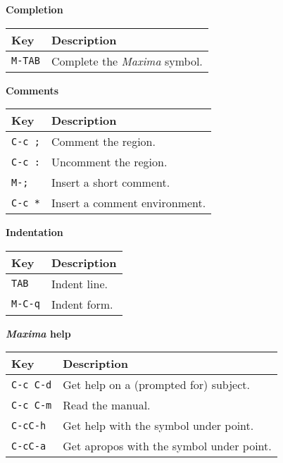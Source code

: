 \documentclass{article}
\newcommand{\mx}{\textsl{\sffamily Maxima}}
\begin{document}
\smallskip

\noindent
\textbf{Completion}

\smallskip

\noindent
\begin{tabular}{p{\firstcol}p{\secondcol}}
\hline
\textbf{Key} & \textbf{Description}\\
\hline
\texttt{M-TAB} & Complete the \mx{} symbol.\\
\end{tabular}

\smallskip

\noindent
\textbf{Comments}

\smallskip

\noindent
\begin{tabular}{p{\firstcol}p{\secondcol}}
\hline
\textbf{Key} & \textbf{Description}\\
\hline
\texttt{C-c ;} & Comment the region.\\
\texttt{C-c :} & Uncomment the region.\\
\texttt{M-;} & Insert a short comment.\\
\texttt{C-c *} & Insert a comment environment.
\end{tabular}


\smallskip

\noindent
\textbf{Indentation}

\smallskip

\noindent
\begin{tabular}{p{\firstcol}p{\secondcol}}
\hline
\textbf{Key} & \textbf{Description}\\
\hline
\texttt{TAB} & Indent line.\\
\texttt{M-C-q} & Indent form.
\end{tabular}


\smallskip

\noindent
\textbf{\mx{} help}

\smallskip

\noindent
\begin{tabular}{p{\firstcol}p{\secondcol}}
\hline
\textbf{Key} & \textbf{Description}\\
\hline
\texttt{C-c C-d}
& Get help on a (prompted for) subject.\\
\texttt{C-c C-m}
& Read the manual.\\
\texttt{C-cC-h} & Get help with the symbol under point.\\
\texttt{C-cC-a} & Get apropos with the symbol under point.
\end{tabular}
\end{document}
